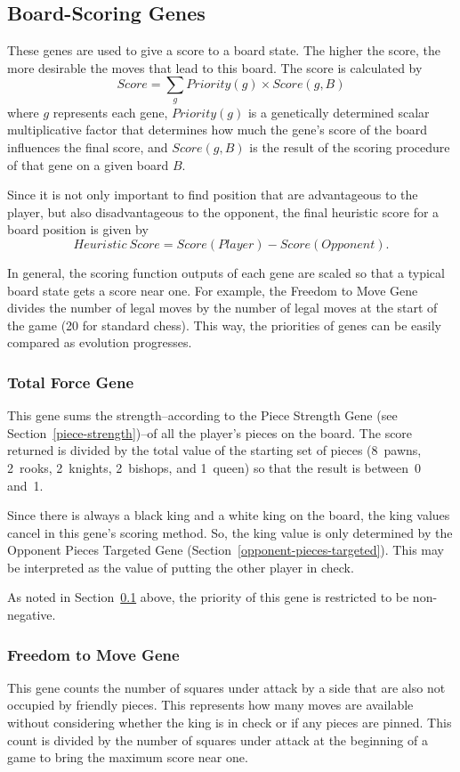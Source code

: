 \documentclass[letterpaper]{article}
\renewcommand{\_}{\allowbreak\textunderscore\allowbreak}
\begin{document}
\subsection{Board-Scoring Genes}\label{board-score-section}

These genes are used to give a score to a board state. The higher the score, the more desirable the moves that lead to this board. The score is calculated by
\[Score = \sum_g Priority(g) \times Score(g,B)\]
where \(g\) represents each gene, \(Priority(g)\) is a genetically determined scalar multiplicative factor that determines how much the gene's score of the board influences the final score, and \(Score(g,B)\) is the result of the scoring procedure of that gene on a given board \(B\).

Since it is not only important to find position that are advantageous to the player, but also disadvantageous to the opponent, the final heuristic score for a board position is given by
\[Heuristic\ Score = Score(Player) - Score(Opponent).\]

In general, the scoring function outputs of each gene are scaled so that a typical board state gets a score near one. For example, the Freedom to Move Gene divides the number of legal moves by the number of legal moves at the start of the game (20 for standard chess). This way, the priorities of genes can be easily compared as evolution progresses.

\subsubsection{Total Force Gene}\label{total-force}
This gene sums the strength--according to the Piece Strength Gene (see Section~\ref{piece-strength})--of all the player's pieces on the board. The score returned is divided by the total value of the starting set of pieces (8~pawns, 2~rooks, 2~knights, 2~bishops, and 1~queen) so that the result is between~0 and~1.

Since there is always a black king and a white king on the board, the king values cancel in this gene's scoring method. So, the king value is only determined by the Opponent Pieces Targeted Gene (Section~\ref{opponent-pieces-targeted}). This may be interpreted as the value of putting the other player in check.

As noted in Section~\ref{board-score-section} above, the priority of this gene is restricted to be non-negative.

\subsubsection{Freedom to Move Gene}
This gene counts the number of squares under attack by a side that are also not occupied by friendly pieces. This represents how many moves are available without considering whether the king is in check or if any pieces are pinned. This count is divided by the number of squares under attack at the beginning of a game to bring the maximum score near one.
\end{document}

